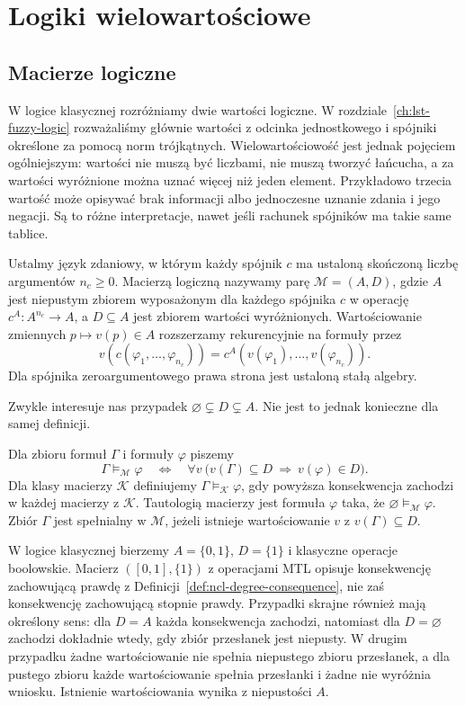 \chapter{Logiki wielowartościowe}\label{ch:ncl-many-valued}

\section{Macierze logiczne}
W logice klasycznej rozróżniamy dwie wartości logiczne.
W rozdziale~\ref{ch:lst-fuzzy-logic} rozważaliśmy
głównie wartości z odcinka jednostkowego i spójniki
określone za pomocą norm trójkątnych. Wielowartościowość
jest jednak pojęciem ogólniejszym: wartości nie muszą
być liczbami, nie muszą tworzyć łańcucha, a za wartości
wyróżnione można uznać więcej niż jeden element.
Przykładowo trzecia wartość może opisywać brak
informacji albo jednoczesne uznanie zdania i jego
negacji. Są to różne interpretacje, nawet jeśli
rachunek spójników ma takie same tablice.

\begin{definicja}\label{def:ncl-matrix}
Ustalmy język zdaniowy, w którym każdy spójnik $c$
ma ustaloną skończoną liczbę argumentów $n_c\geq0$.
Macierzą logiczną nazywamy parę
$\mathcal M=(A,D)$, gdzie $A$ jest niepustym zbiorem
wyposażonym dla każdego spójnika $c$ w operację
$c^A:A^{n_c}\to A$, a $D\subseteq A$ jest zbiorem
wartości wyróżnionych. Wartościowanie zmiennych
$p\mapsto v(p)\in A$ rozszerzamy rekurencyjnie na
formuły przez
\[
 v(c(\varphi_1,\ldots,\varphi_{n_c}))
 =c^A(v(\varphi_1),\ldots,v(\varphi_{n_c})).
\]
Dla spójnika zeroargumentowego prawa strona jest
ustaloną stałą algebry.
\end{definicja}
Zwykle interesuje nas przypadek $\varnothing\subsetneq D
\subsetneq A$. Nie jest to jednak konieczne dla samej
definicji.

\begin{definicja}\label{def:ncl-matrix-consequence}
Dla zbioru formuł $\Gamma$ i formuły $\varphi$ piszemy
\[
 \Gamma\models_{\mathcal M}\varphi
 \quad\Longleftrightarrow\quad
 \forall v\ \bigl(v(\Gamma)\subseteq D
                 \ \Longrightarrow\ v(\varphi)\in D\bigr).
\]
Dla klasy macierzy $\mathcal K$ definiujemy
$\Gamma\models_{\mathcal K}\varphi$, gdy powyższa
konsekwencja zachodzi w każdej macierzy z $\mathcal K$.
Tautologią macierzy jest formuła $\varphi$ taka,
że $\varnothing\models_{\mathcal M}\varphi$.
Zbiór $\Gamma$ jest spełnialny w $\mathcal M$, jeżeli
istnieje wartościowanie $v$ z $v(\Gamma)\subseteq D$.
\end{definicja}
W logice klasycznej bierzemy $A=\{0,1\}$, $D=\{1\}$
i klasyczne operacje boolowskie. Macierz
$([0,1],\{1\})$ z operacjami MTL opisuje konsekwencję
zachowującą prawdę z
Definicji~\ref{def:ncl-degree-consequence}, nie zaś
konsekwencję zachowującą stopnie prawdy.
Przypadki skrajne również mają określony sens:
dla $D=A$ każda konsekwencja zachodzi, natomiast
dla $D=\varnothing$ zachodzi dokładnie wtedy, gdy
zbiór przesłanek jest niepusty. W drugim przypadku
żadne wartościowanie nie spełnia niepustego zbioru
przesłanek, a dla pustego zbioru każde wartościowanie
spełnia przesłanki i żadne nie wyróżnia wniosku.
Istnienie wartościowania wynika z niepustości $A$.

